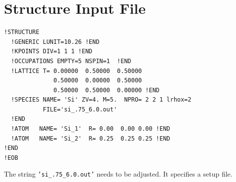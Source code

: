 \documentclass[a4paper,10pt]{report}
\newcommand{\mytt}[1]{{\tt #1}}
\begin{document}
\section{Structure Input File}
\begin{verbatim}
!STRUCTURE
  !GENERIC LUNIT=10.26 !END
  !KPOINTS DIV=1 1 1 !END
  !OCCUPATIONS EMPTY=5 NSPIN=1  !END
  !LATTICE T= 0.00000  0.50000  0.50000
              0.50000  0.00000  0.50000
              0.50000  0.50000  0.00000 !END
  !SPECIES NAME= 'Si' ZV=4. M=5.  NPRO= 2 2 1 lrhox=2
           FILE='si_.75_6.0.out'  
  !END
  !ATOM   NAME= 'Si_1'  R= 0.00  0.00 0.00 !END
  !ATOM   NAME= 'Si_2'  R= 0.25  0.25 0.25 !END
!END
!EOB
\end{verbatim}

The string \mytt{'si\_.75\_6.0.out'} needs to be adjusted. It specifies a setup file.


\printindex
\end{document}
